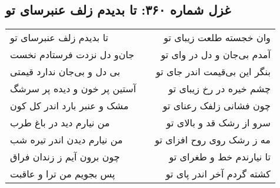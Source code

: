 \begin{center}
\section*{غزل شماره ۳۶۰: تا بدیدم زلف عنبرسای تو}
\label{sec:360}
\begin{longtable}{l p{0.5cm} r}
تا بدیدم زلف عنبرسای تو
&&
وان خجسته طلعت زیبای تو
\\
جان‌و دل نزدت فرستادم نخست
&&
آمدم بی‌جان و دل در وای تو
\\
بی دل و بی‌جان ندارد قیمتی
&&
بنگر این بی‌قیمت اندر جای تو
\\
آستین پر خون و دیده پر سرشگ
&&
چشم خیره در رخ زیبای تو
\\
مشک و عنبر بارد اندر کل کون
&&
چون فشانی زلفک رعنای تو
\\
من نیارم دید در باغ طرب
&&
سرو از رشک قد و بالای تو
\\
من نیارم دیدن اندر تیره شب
&&
مه ز رشک روی روح افزای تو
\\
چون برون آیم ز زندان فراق
&&
تا نیارندم خط و طغرای تو
\\
پس بجویم من ترا و عاقبت
&&
کشته گردم آخر اندر پای تو
\\
\end{longtable}
\end{center}
